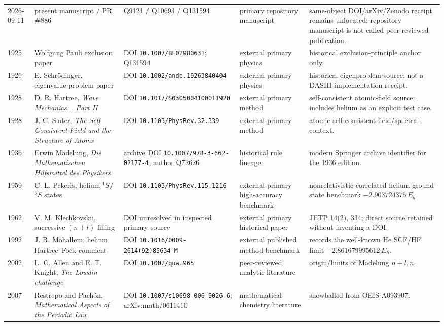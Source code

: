 \begin{longtable}{p{}p{}p{}p{}p{}}
2026-09-11 & present manuscript / PR \#886 & Q9121 / Q10693 / Q131594 & primary repository manuscript & same-object DOI/arXiv/Zenodo receipt remains unlocated; repository manuscript is not called peer-reviewed publication.\\
1925 & Wolfgang Pauli exclusion paper & DOI \texttt{10.1007/BF02980631}; Q131594 & external primary physics & historical exclusion-principle anchor only.\\
1926 & E. Schr\"odinger, eigenvalue-problem paper & DOI \texttt{10.1002/andp.19263840404} & external primary physics & historical eigenproblem source; not a DASHI implementation receipt.\\
1928 & D. R. Hartree, \emph{Wave Mechanics... Part II} & DOI \texttt{10.1017/S0305004100011920} & external primary method & self-consistent atomic-field source; includes helium as an explicit test case.\\
1928 & J. C. Slater, \emph{The Self Consistent Field and the Structure of Atoms} & DOI \texttt{10.1103/PhysRev.32.339} & external primary method & atomic self-consistent-field/spectral context.\\
1936 & Erwin Madelung, \emph{Die Mathematischen Hilfsmittel des Physikers} & archive DOI \texttt{10.1007/978-3-662-02177-4}; author Q72626 & historical rule lineage & modern Springer archive identifier for the 1936 edition.\\
1959 & C. L. Pekeris, helium $^1S$/$^3S$ states & DOI \texttt{10.1103/PhysRev.115.1216} & external primary high-accuracy benchmark & nonrelativistic correlated helium ground-state benchmark $-2.903724375\,E_h$.\\
1962 & V. M. Klechkovskii, successive $(n+l)$ filling & DOI unresolved in inspected primary source & external primary historical paper & JETP 14(2), 334; direct source retained without inventing a DOI.\\
1992 & J. R. Mohallem, helium Hartree--Fock comment & DOI \texttt{10.1016/0009-2614(92)85634-M} & external published method benchmark & records the well-known He SCF/HF limit $-2.861679995612\,E_h$.\\
2002 & L. C. Allen and E. T. Knight, \emph{The Lowdin challenge} & DOI \texttt{10.1002/qua.965} & peer-reviewed analytic literature & origin/limits of Madelung $n+l,n$.\\
2007 & Restrepo and Pach\'on, \emph{Mathematical Aspects of the Periodic Law} & DOI \texttt{10.1007/s10698-006-9026-6}; arXiv:math/0611410 & mathematical-chemistry literature & snowballed from OEIS A093907.\\

\end{longtable}
